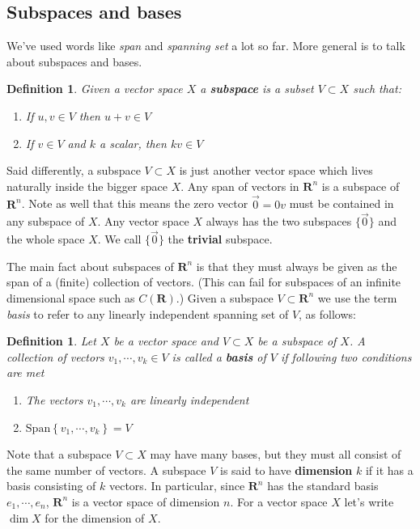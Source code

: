 \documentclass[12pt]{article}
\numberwithin{equation}{subsection}
\numberwithin{figure}{subsection}
\newtheorem{defn}[subsection]{Definition}
\theoremstyle{note}
\newcommand\Span[1]{\mathrm{Span}\left\{#1\right\}}
\begin{document}
\subsection{Subspaces and bases}
We've used words like \textit{span} and \textit{spanning set} a lot so far. More general is to talk about subspaces and bases. 

\begin{defn} Given a vector space $X$ a \textbf{subspace} is a subset $V\subset X$ such that: 
\begin{enumerate}
	\item If $u,v\in V$ then $u+v\in V$
	\item If $v\in V$ and $k$ a scalar, then $kv\in V$
\end{enumerate}
\end{defn}

Said differently, a subspace $V\subset X$ is just another vector space which lives naturally inside the bigger space $X$. Any span of vectors in $\mathbf{R}^n$ is a subspace of $\mathbf{R}^n$. Note as well that this means the zero vector $\vec{0}=0v$ must be contained in any subspace of $X$. Any vector space $X$ always has the two subspaces $\{\vec{0}\}$ and the whole space $X$. We call $\{\vec{0}\}$ the \textbf{trivial} subspace. 

The main fact about subspaces of $\mathbf{R}^n$ is that they must always be given as the span of a (finite) collection of vectors. (This can fail for subspaces of an infinite dimensional space such as $C(\mathbf{R})$.) Given a subspace $V\subset\mathbf{R}^n$ we use the term \textit{basis} to refer to any linearly independent spanning set of $V$, as follows:

\begin{defn}Let $X$ be a vector space and  $V\subset X$ be a subspace of $X$. A collection of vectors $v_1,\cdots,v_k\in V$ is called a \textbf{basis} of $V$ if following two conditions are met
\begin{enumerate}
	\item The vectors $v_1,\cdots,v_k$ are linearly independent
	\item $\Span{v_1,\cdots, v_k}=V$
\end{enumerate}
\end{defn}

Note that a subspace $V\subset X$ may have many bases, but they must all consist of the same number of vectors. A subspace $V$ is said to have \textbf{dimension} $k$ if it has a basis consisting of $k$ vectors. In particular, since $\mathbf{R}^n$ has the standard basis $e_1,\cdots,e_n$, $\mathbf{R}^n$ is a vector space of dimension $n$. For a vector space $X$ let's write $\dim X$ for the dimension of $X$. 
\end{document}
